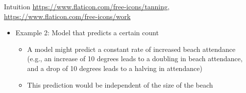 \documentclass[aspectratio=169]{beamer}
\begin{document}
\begin{frame}[allowframebreaks]{Intuition}
  \vfill
{\scriptsize
  \url{https://www.flaticon.com/free-icons/tanning},
  \url{https://www.flaticon.com/free-icons/work}
  }
  \framebreak
  
  \begin{itemize}
      \item Example 2: Model that predicts a certain count
      \begin{itemize}
        \item A model might predict a constant rate of increased beach
          attendance (e.g., an increase of 10 degrees leads to a doubling in
          beach attendance, and a drop of 10 degrees leads to a halving in
          attendance)
        \item This prediction would be independent of the size of the beach
      \end{itemize}
  \end{itemize}
  \vspace{.5cm}


\end{frame}
\end{document}
